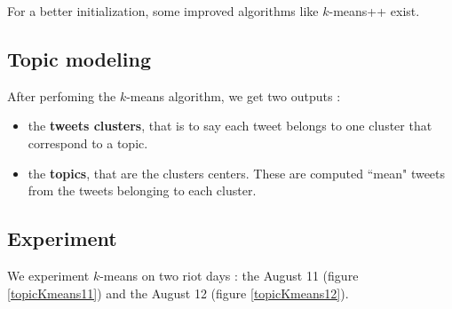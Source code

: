 \documentclass[a4paper,twoside,12pt,openright]{report}
\begin{document}
For a better initialization, some improved algorithms like $k$-means++ exist.

\subsection{Topic modeling}

After perfoming the $k$-means algorithm, we get two outputs : 
\begin{itemize}
\item the \textbf{tweets clusters}, that is to say each tweet belongs to one cluster that correspond to a topic.
\item the \textbf{topics}, that are the clusters centers. These are computed ``mean" tweets from the tweets belonging to each cluster.
\end{itemize}

\newpage 

\subsection{Experiment}
We experiment $k$-means on two riot days : the August 11 (figure \ref{topicKmeans11}) and the August 12 (figure \ref{topicKmeans12}).
\end{document}
